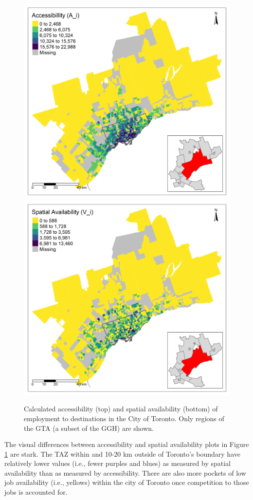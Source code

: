\documentclass[]{elsarticle} %
\begin{document}
\begin{figure}

{\centering \includegraphics[width=0.8\linewidth]{images/allplot_access_TTS} \includegraphics[width=0.8\linewidth]{images/allplot_SA_TTS} 

}

\caption{\label{fig:plot-access-SA-Toronto-TTS}Calculated accessibility (top) and spatial availability (bottom) of employment to destinations in the City of Toronto. Only regions of the GTA (a subset of the GGH) are shown.}\label{fig:plot-access-SA-Toronto-TTS}
\end{figure}

The visual differences between accessibility and spatial availability
plots in Figure \ref{fig:plot-access-SA-Toronto-TTS} are stark. The TAZ
within and 10-20 km outside of Toronto's boundary have relatively lower
values (i.e., fewer purples and blues) as measured by spatial
availability than as measured by accessibility. There are also more
pockets of low job availability (i.e., yellows) within the city of
Toronto once competition to those jobs is accounted for.
\end{document}
